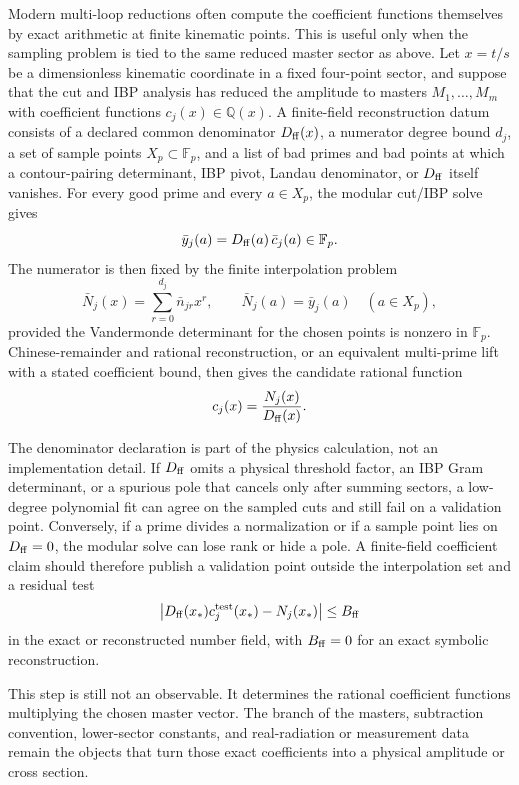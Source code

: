 \begin{controlledapproximation}
\label{ca:finite-field-master-coefficient-reconstruction}
Modern multi-loop reductions often compute the coefficient functions
themselves by exact arithmetic at finite kinematic points.  This is useful
only when the sampling problem is tied to the same reduced master sector as
above.  Let \(x=t/s\) be a dimensionless kinematic coordinate in a fixed
four-point sector, and suppose that the cut and IBP analysis has reduced the
amplitude to masters \(M_1,\ldots,M_m\) with coefficient functions
\(c_j(x)\in\mathbb Q(x)\).  A finite-field reconstruction datum consists of
a declared common denominator \(D_{\rm ff}(x)\), a numerator degree bound
\(d_j\), a set of sample points \(X_p\subset\mathbb F_p\), and a list of bad
primes and bad points at which a contour-pairing determinant, IBP pivot,
Landau denominator, or \(D_{\rm ff}\) itself vanishes.  For every good prime
and every \(a\in X_p\), the modular cut/IBP solve gives
\[
  \bar y_j(a)
  =
  D_{\rm ff}(a)\,\bar c_j(a)\in\mathbb F_p .
\]
The numerator is then fixed by the finite interpolation problem
\begin{equation}
  \bar N_j(x)=\sum_{r=0}^{d_j}\bar n_{jr}x^r,
  \qquad
  \bar N_j(a)=\bar y_j(a)\quad (a\in X_p),
  \label{eq:finite-field-master-coefficient-interpolation}
\end{equation}
provided the Vandermonde determinant for the chosen points is nonzero in
\(\mathbb F_p\).  Chinese-remainder and rational reconstruction, or an
equivalent multi-prime lift with a stated coefficient bound, then gives the
candidate rational function
\begin{equation}
  c_j(x)=\frac{N_j(x)}{D_{\rm ff}(x)} .
  \label{eq:finite-field-master-coefficient-lift}
\end{equation}

The denominator declaration is part of the physics calculation, not an
implementation detail.  If \(D_{\rm ff}\) omits a physical threshold factor,
an IBP Gram determinant, or a spurious pole that cancels only after summing
sectors, a low-degree polynomial fit can agree on the sampled cuts and still
fail on a validation point.  Conversely, if a prime divides a normalization or
if a sample point lies on \(D_{\rm ff}=0\), the modular solve can lose rank or
hide a pole.  A finite-field coefficient claim should therefore publish a
validation point outside the interpolation set and a residual test
\[
  \left|
    D_{\rm ff}(x_\ast)c_j^{\rm test}(x_\ast)-N_j(x_\ast)
  \right|
  \le B_{\rm ff}
\]
in the exact or reconstructed number field, with \(B_{\rm ff}=0\) for an
exact symbolic reconstruction.

This step is still not an observable.  It determines the rational
coefficient functions multiplying the chosen master vector.  The branch of
the masters, subtraction convention, lower-sector constants, and real-radiation
or measurement data remain the objects that turn those exact coefficients
into a physical amplitude or cross section.
\end{controlledapproximation}

